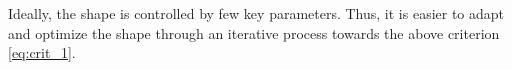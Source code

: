 Ideally, the shape is controlled by few key parameters. Thus, it is easier to adapt and optimize the shape through an iterative process towards the above criterion \cref{eq:crit_1}.




